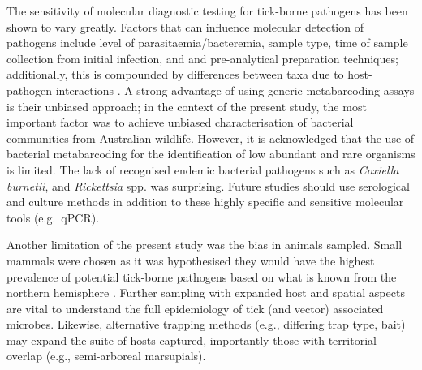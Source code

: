 \documentclass[a4paper, nobind]{templates/ociamthesis}
\begin{document}
The sensitivity of molecular diagnostic testing for tick-borne pathogens has been shown to vary greatly.
Factors that can influence molecular detection of pathogens include level of parasitaemia/bacteremia, sample type, time of sample collection from initial infection, and and pre-analytical preparation techniques; additionally, this is compounded by differences between taxa due to host-pathogen interactions \autocite{delafuenteTickPathogenInteractionsVector2017,estrada-penaFunctionalRedundancyEcological2017,bonnetEditorialTickHostPathogenInteractions2018}.
A strong advantage of using generic metabarcoding assays is their unbiased approach; in the context of the present study, the most important factor was to achieve unbiased characterisation of bacterial communities from Australian wildlife.
However, it is acknowledged that the use of bacterial metabarcoding for the identification of low abundant and rare organisms is limited.
The lack of recognised endemic bacterial pathogens such as \emph{Coxiella burnetii}, and \emph{Rickettsia} spp. was surprising.
Future studies should use serological and culture methods in addition to these highly specific and sensitive molecular tools (e.g.~qPCR).

Another limitation of the present study was the bias in animals sampled.
Small mammals were chosen as it was hypothesised they would have the highest prevalence of potential tick-borne pathogens based on what is known from the northern hemisphere \autocite{bastianAntibodyPrevalenceMolecular2012,bouchardHarvestedWhitetailedDeer2013,sweiEvidenceTransmissionZoonotic2019}.
Further sampling with expanded host and spatial aspects are vital to understand the full epidemiology of tick (and vector) associated microbes. Likewise, alternative trapping methods (e.g., differing trap type, bait) may expand the suite of hosts captured, importantly those with territorial overlap (e.g., semi-arboreal marsupials).
\end{document}
